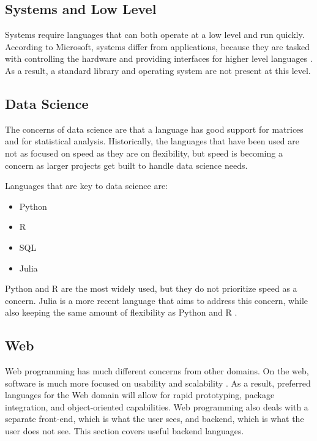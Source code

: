 \documentclass[12pt, oneside, a4paper]{book}
\begin{document}
         \subsection{Systems and Low Level}
         Systems require languages that can both operate at a low level and run quickly.
         According to Microsoft, systems differ from applications, because they are tasked with controlling the hardware and providing interfaces for higher level languages \autocite{microsoftPanelSystemsProgramming2014}.
         As a result, a standard library and operating system are not present at this level.

         \subsection{Data Science}
         The concerns of data science are that a language has good support for matrices and for statistical analysis.
         Historically, the languages that have been used are not as focused on speed as they are on flexibility, but speed is becoming a concern as larger projects get built to handle data science needs.

         Languages that are key to data science are:
         \begin{itemize}
            \item Python
            \item R
            \item SQL
            \item Julia
         \end{itemize} \autocite{MostPopularLanguages}

         Python and R are the most widely used, but they do not prioritize speed as a concern.
         Julia is a more recent language that aims to address this concern, while also keeping the same amount of flexibility as Python and R \autocite{MostPopularLanguages}.

         \subsection{Web}
         Web programming has much different concerns from other domains.
         On the web, software is much more focused on usability and scalability \autocite{siiaSoftwareServiceChanging2004}.
         As a result, preferred languages for the Web domain will allow for rapid prototyping, package integration, and object-oriented capabilities.
         Web programming also deals with a separate front-end, which is what the user sees, and backend, which is what the user does not see.
         This section covers useful backend languages.
\end{document}
